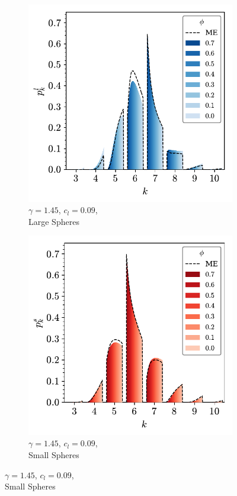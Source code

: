 \begin{figure}[bt]
      \begin{subfigure}[b]{0.48\textwidth}
         \centering
         \includegraphics[width=\textwidth]{./figures/quasi2d/phi_me_l_9.pdf}
         \caption{$\gamma=1.45$, $c_l=0.09$, \\Large Spheres}
         \label{fig:bime3}
     \end{subfigure}
     \hfill
     \begin{subfigure}[b]{0.48\textwidth}
         \centering
         \includegraphics[width=\textwidth]{./figures/quasi2d/phi_me_s_9.pdf}
         \caption{$\gamma=1.45$, $c_l=0.09$, \\Small Spheres}
         \label{fig:bime3}
     \end{subfigure}
     \hfill
    

\end{figure}
